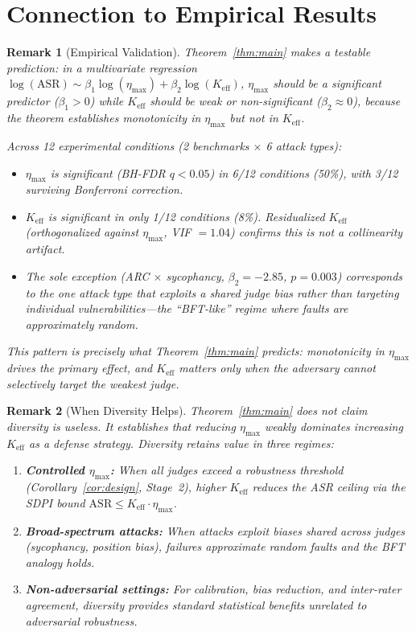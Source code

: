\documentclass[11pt]{article}
\newtheorem*{remark}{Remark}
\begin{document}
\section{Connection to Empirical Results}

\begin{remark}[Empirical Validation]
Theorem~\ref{thm:main} makes a testable prediction: in a multivariate regression $\log(\mathrm{ASR}) \sim \beta_1 \log(\eta_{\max}) + \beta_2 \log(K_{\mathrm{eff}})$, $\eta_{\max}$ should be a significant predictor ($\beta_1 > 0$) while $K_{\mathrm{eff}}$ should be weak or non-significant ($\beta_2 \approx 0$), because the theorem establishes monotonicity in $\eta_{\max}$ but not in $K_{\mathrm{eff}}$.

Across 12 experimental conditions (2 benchmarks $\times$ 6 attack types):
\begin{itemize}
    \item $\eta_{\max}$ is significant (BH-FDR $q < 0.05$) in 6/12 conditions (50\%), with 3/12 surviving Bonferroni correction.
    \item $K_{\mathrm{eff}}$ is significant in only 1/12 conditions (8\%). Residualized $K_{\mathrm{eff}}$ (orthogonalized against $\eta_{\max}$, VIF $= 1.04$) confirms this is not a collinearity artifact.
    \item The sole exception (ARC $\times$ sycophancy, $\beta_2 = -2.85$, $p = 0.003$) corresponds to the one attack type that exploits a \emph{shared} judge bias rather than targeting individual vulnerabilities---the ``BFT-like'' regime where faults are approximately random.
\end{itemize}
This pattern is precisely what Theorem~\ref{thm:main} predicts: monotonicity in $\eta_{\max}$ drives the primary effect, and $K_{\mathrm{eff}}$ matters only when the adversary cannot selectively target the weakest judge.
\end{remark}

\begin{remark}[When Diversity Helps]
Theorem~\ref{thm:main} does \emph{not} claim diversity is useless. It establishes that \emph{reducing $\eta_{\max}$ weakly dominates increasing $K_{\mathrm{eff}}$} as a defense strategy. Diversity retains value in three regimes:
\begin{enumerate}[label=(\roman*)]
    \item \textbf{Controlled $\eta_{\max}$:} When all judges exceed a robustness threshold (Corollary~\ref{cor:design}, Stage~2), higher $K_{\mathrm{eff}}$ reduces the ASR ceiling via the SDPI bound $\mathrm{ASR} \leq K_{\mathrm{eff}} \cdot \eta_{\max}$.
    \item \textbf{Broad-spectrum attacks:} When attacks exploit biases shared across judges (sycophancy, position bias), failures approximate random faults and the BFT analogy holds.
    \item \textbf{Non-adversarial settings:} For calibration, bias reduction, and inter-rater agreement, diversity provides standard statistical benefits unrelated to adversarial robustness.
\end{enumerate}
\end{remark}
\end{document}

